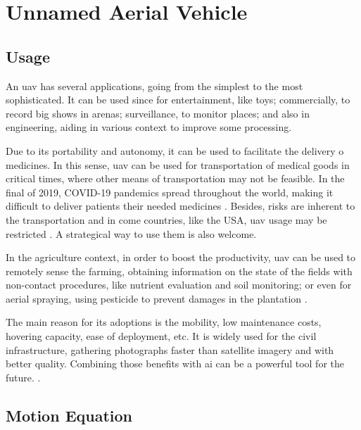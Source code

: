 \section{Unnamed Aerial Vehicle}

\subsection{Usage}

An \gls*{uav} has several applications, going from the simplest to the most sophisticated. It can be used since for entertainment, like toys; commercially, to record big shows in arenas; surveillance, to monitor places; and also in engineering, aiding in various context to improve some processing.

Due to its portability and autonomy, it can be used to facilitate the delivery o medicines. In this sense, \gls*{uav} can be used for transportation of medical goods in critical times, where other means of transportation may not be feasible.
In the final of 2019, COVID-19 pandemics spread throughout the world, making it difficult to deliver patients their needed medicines \cite{ramakrishnan2023,mcphillips2022}.
Besides, risks are inherent to the transportation and in come countries, like the USA, \gls*{uav} usage may be restricted \citep{thiels2015}. 
A strategical way to use them is also welcome.

In the agriculture context, in order to boost the productivity, \gls*{uav} can be used to remotely sense the farming, obtaining information on the state of the fields with non-contact procedures, like nutrient evaluation and soil monitoring; or even for aerial spraying, using pesticide to prevent damages in the plantation \citep{delcerro2021}.

The main reason for its adoptions is the mobility, low maintenance costs, hovering capacity, ease of deployment, etc. 
It is widely used for the civil infrastructure, gathering photographs faster than  satellite imagery and with better quality. 
Combining those benefits with \gls*{ai} can be a powerful tool for the future. \citet{sivakumar2021}. 

\subsection{Motion Equation}


